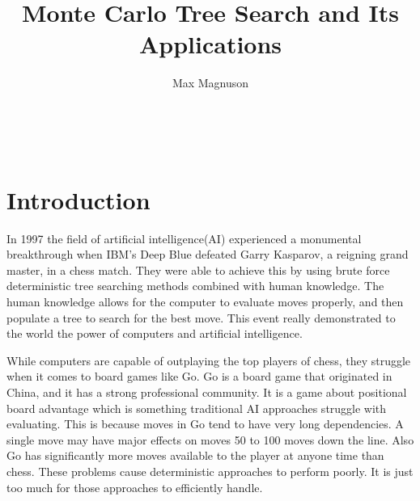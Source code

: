 \documentclass{sig-alternate}
\begin{document}

\title{Monte Carlo Tree Search and Its Applications}


\author{
\alignauthor
Max Magnuson\\
	\\
	\\
	\\
}

\maketitle
\begin{abstract}

\end{abstract}


\section{Introduction} 
In 1997 the field of artificial intelligence(AI) experienced a monumental breakthrough when IBM's Deep Blue defeated Garry Kasparov, a reigning grand master, in a chess match\cite{TheGrandChallenge}. They were able to achieve this by using brute force deterministic tree searching methods combined with human knowledge. The human knowledge allows for the computer to evaluate moves properly, and then populate a tree to search for the best move. This event really demonstrated to the world the power of computers and artificial intelligence. 

While computers are capable of outplaying the top players of chess, they struggle when it comes to board games like Go\cite{TheGrandChallenge}. Go is a board game that originated in China, and it has a strong professional community. It is a game about positional board advantage which is something traditional AI approaches struggle with evaluating. This is because moves in Go tend to have very long dependencies. A single move may have major effects on moves 50 to 100 moves down the line. Also Go has significantly more moves available to the player at anyone time than chess. These problems cause deterministic approaches to perform poorly. It is just too much for those approaches to efficiently handle.
\end{document}
